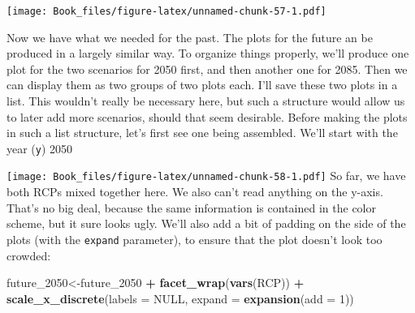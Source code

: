 \documentclass[
]{book}
\newenvironment{Shaded}{\begin{snugshade}}{\end{snugshade}}
\newcommand{\DataTypeTok}[1]{\textcolor[rgb]{0.13,0.29,0.53}{#1}}
\newcommand{\DecValTok}[1]{\textcolor[rgb]{0.00,0.00,0.81}{#1}}
\newcommand{\KeywordTok}[1]{\textcolor[rgb]{0.13,0.29,0.53}{\textbf{#1}}}
\newcommand{\NormalTok}[1]{#1}
\newcommand{\OperatorTok}[1]{\textcolor[rgb]{0.81,0.36,0.00}{\textbf{#1}}}
\newcommand{\OtherTok}[1]{\textcolor[rgb]{0.56,0.35,0.01}{#1}}
\newcommand{\StringTok}[1]{\textcolor[rgb]{0.31,0.60,0.02}{#1}}
\begin{document}
\texttt{[image: Book\_files/figure-latex/unnamed-chunk-57-1.pdf]}

Now we have what we needed for the past. The plots for the future an be produced in a largely similar way. To organize things properly, we'll produce one plot for the two scenarios for 2050 first, and then another one for 2085. Then we can display them as two groups of two plots each. I'll save these two plots in a list. This wouldn't really be necessary here, but such a structure would allow us to later add more scenarios, should that seem desirable. Before making the plots in such a list structure, let's first see one being assembled. We'll start with the year (\texttt{y}) 2050

\begin{Shaded}
\end{Shaded}

\texttt{[image: Book\_files/figure-latex/unnamed-chunk-58-1.pdf]}
So far, we have both RCPs mixed together here. We also can't read anything on the y-axis. That's no big deal, because the same information is contained in the color scheme, but it sure looks ugly. We'll also add a bit of padding on the side of the plots (with the \texttt{expand} parameter), to ensure that the plot doesn't look too crowded:

\begin{Shaded}
\begin{Highlighting}[]
\NormalTok{future_}\DecValTok{2050}\NormalTok{<-future_}\DecValTok{2050} \OperatorTok{+}
\StringTok{  }\KeywordTok{facet_wrap}\NormalTok{(}\KeywordTok{vars}\NormalTok{(RCP)) }\OperatorTok{+}
\StringTok{   }\KeywordTok{scale_x_discrete}\NormalTok{(}\DataTypeTok{labels =} \OtherTok{NULL}\NormalTok{, }\DataTypeTok{expand =} \KeywordTok{expansion}\NormalTok{(}\DataTypeTok{add =} \DecValTok{1}\NormalTok{)) }
\end{Highlighting}
\end{Shaded}
\end{document}
